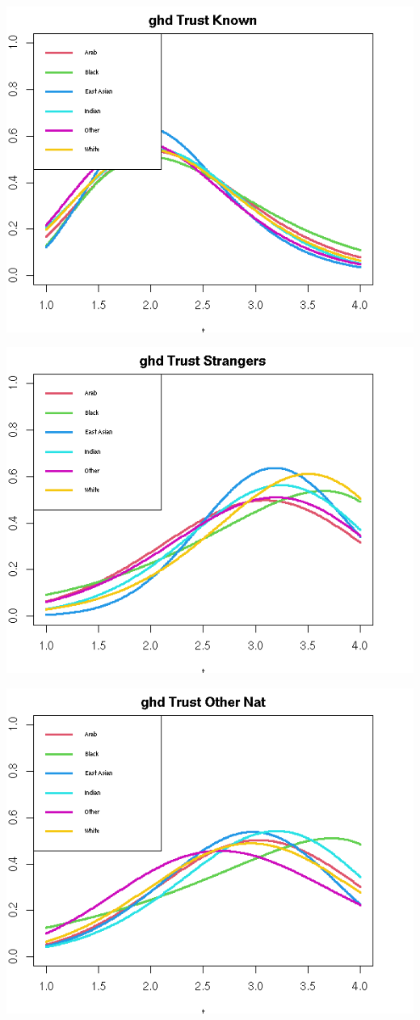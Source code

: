 \documentclass{amsart}
\begin{document}
\includegraphics[scale=0.8]{trknown_fitted.png}


\includegraphics[scale=0.8]{trstrangers_fitted.png}

\includegraphics[scale=0.8]{trothernat_fitted.png}
\end{document}
